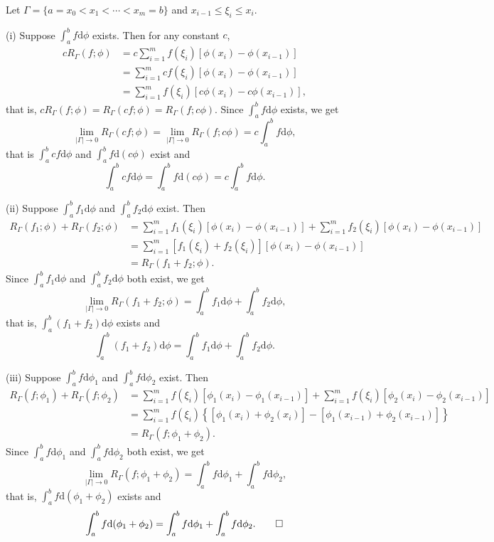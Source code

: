 \begin{exercise}{2.13}
Let $\Gamma=\{a=x_0<x_1<\cdots<x_m=b\}$ and $x_{i-1}\leq\xi_i\leq x_i$.

(i) Suppose $\int_a^bf\mathrm{d}\phi$ exists. Then for any constant $c$,
\begin{equation*}
  \begin{aligned}
    cR_\Gamma(f;\phi)&=c\sum_{i=1}^mf(\xi_i)[\phi(x_i)-\phi(x_{i-1})]\\
    &=\sum_{i=1}^mcf(\xi_i)[\phi(x_i)-\phi(x_{i-1})]\\
    &=\sum_{i=1}^mf(\xi_i)[c\phi(x_i)-c\phi(x_{i-1})],
  \end{aligned}
\end{equation*}
that is, $cR_\Gamma(f;\phi)=	R_\Gamma(cf;\phi)=	R_\Gamma(f;c\phi)$. Since $\int_a^bf\mathrm{d}\phi$ exists, we get
$$\lim_{|\Gamma|\to 0}	R_\Gamma(cf;\phi)=\lim_{|\Gamma|\to 0}	R_\Gamma(f;c\phi)=c\int_a^bf\mathrm{d}\phi,$$
that is $\int_a^bcf\mathrm{d}\phi$ and $\int_a^bf\mathrm{d}(c\phi)$ exist and
$$\int_a^bcf\mathrm{d}\phi=\int_a^bf\mathrm{d}(c\phi)=c\int_a^bf\mathrm{d}\phi.$$

(ii) Suppose $\int_a^bf_1\mathrm{d}\phi$ and $\int_a^bf_2\mathrm{d}\phi$ exist. Then
\begin{equation*}
  \begin{aligned}
    R_\Gamma(f_1;\phi)+R_\Gamma(f_2;\phi)&=\sum_{i=1}^mf_1(\xi_i)[\phi(x_i)-\phi(x_{i-1})]+\sum_{i=1}^mf_2(\xi_i)[\phi(x_i)-\phi(x_{i-1})]\\
    &=\sum_{i=1}^m[f_1(\xi_i)+f_2(\xi_i)][\phi(x_i)-\phi(x_{i-1})]\\&=R_\Gamma(f_1+f_2;\phi).
  \end{aligned}
\end{equation*}
Since $\int_a^bf_1\mathrm{d}\phi$ and  $\int_a^bf_2\mathrm{d}\phi$ both exist, we get
$$\lim_{|\Gamma|\to 0}	R_\Gamma(f_1+f_2;\phi)=\int_a^bf_1\mathrm{d}\phi+\int_a^bf_2\mathrm{d}\phi,$$
that is, $\int_a^b(f_1+f_2)\mathrm{d}\phi$ exists and
$$\int_a^b(f_1+f_2)\mathrm{d}\phi=\int_a^bf_1\mathrm{d}\phi+\int_a^bf_2\mathrm{d}\phi.$$

(iii) Suppose $\int_a^bf\mathrm{d}\phi_1$ and $\int_a^bf\mathrm{d}\phi_2$ exist. Then
\begin{equation*}
  \begin{aligned}
    R_\Gamma(f;\phi_1)+R_\Gamma(f;\phi_2)&=\sum_{i=1}^mf(\xi_i)[\phi_1(x_i)-\phi_1(x_{i-1})]+\sum_{i=1}^mf(\xi_i)[\phi_2(x_i)-\phi_2(x_{i-1})]\\
    &=\sum_{i=1}^mf(\xi_i)\left\{[\phi_1(x_i)+\phi_2(x_i)]-[\phi_1(x_{i-1})+\phi_2(x_{i-1})]\right\}\\&=R_\Gamma(f;\phi_1+\phi_2).
  \end{aligned}
\end{equation*}
Since $\int_a^bf\mathrm{d}\phi_1$ and  $\int_a^bf\mathrm{d}\phi_2$ both exist, we get
$$\lim_{|\Gamma|\to 0}	R_\Gamma(f;\phi_1+\phi_2)=\int_a^bf\mathrm{d}\phi_1+\int_a^bf\mathrm{d}\phi_2,$$
that is, $\int_a^bf\mathrm{d}(\phi_1+\phi_2)$ exists and
\[
  \int_a^bf\mathrm{d}(\phi_1+\phi_2)=\int_a^bf\mathrm{d}\phi_1+\int_a^bf\mathrm{d}\phi_2.
  \qedhere
\]
\end{exercise}

